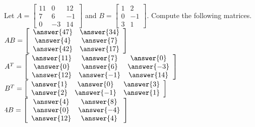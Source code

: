 \documentclass{ximera}
\begin{document}
  		
  		\begin{question} Let $A = \begin{bmatrix} 11& 0 &12\\ 7&6&-1\\ 0 &-3 &14\end{bmatrix}$ and $B = \begin{bmatrix} 1 &2\\ 0 &-1 \\ 3& 1 \end{bmatrix}$. Compute the following matrices.\\
  			
  			$AB = \left[ \begin{array}{cc} \answer{47} & \answer{34} \\ \answer{4} &\answer{7}\\ \answer{42}&\answer{17} \end{array}\right]$\\
  			
  				$A^T = \left[ \begin{array}{ccc} \answer{11} & \answer{7} & \answer{0} \\ \answer{0} &\answer{6}& \answer{-3}\\ \answer{12}&\answer{-1} & \answer{14}\end{array}\right]$\\
  			
  				$B^T = \left[ \begin{array}{ccc} \answer{1} & \answer{0}& \answer{3} \\ \answer{2} &\answer{-1} & \answer{1} \end{array}\right]$\\
  				
  				$4B = \left[\begin{array}{cc} \answer{4} & \answer{8} \\ \answer{0} &\answer{-4}\\ \answer{12}&\answer{4} \end{array}\right]$\\
  			
  			\end{question}
  		
  		
  		
  		
  
\end{document}
